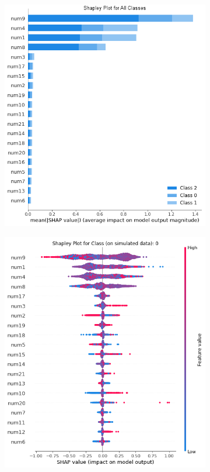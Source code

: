 \documentclass{article}
\begin{document}
\begin{figure}[H]
	\begin{subfigure}[tb]{.5\textwidth}
		\begin{center}
			\includegraphics[width=\linewidth]{img/global_shap_sim.png}
			\caption{}
			\label{fig:global_shap}
		\end{center}
	\end{subfigure}%
	\begin{subfigure}[tb]{.5\textwidth}
		\begin{center}
			\includegraphics[width=\linewidth]{img/class_0_shap_sim.png}

\end{center}
\end{subfigure}
\end{figure}
\end{document}
